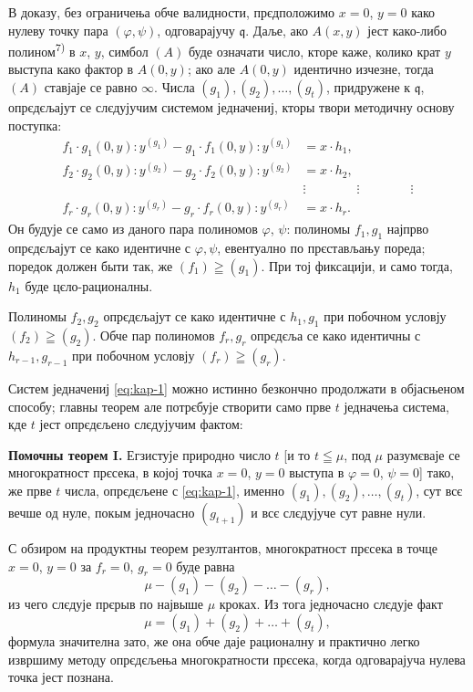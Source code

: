 \documentclass[11pt]{article}
\theoremstyle{plain}
\begin{document}
В доказу, без ограничења обче валидности, прєдположимо $x = 0$,
$y = 0$ како нулеву точку пара $(\varphi, \psi)$, одговарајучу
$\mathfrak{q}$. Даље, ако $A(x,y)$ јест како-либо полином\textsuperscript{7)}
в $x$, $y$, симбол $(A)$ буде означати число, кторе каже, колико
крат $y$ выступа како фактор в $A(0,y)$; ако але $A(0,y)$
идентично изчезне, тогда $(A)$ ставјаје се равно $\infty$. Числа
$(g_{1}), (g_{2}), \ldots, (g_{t})$, придружене к $\mathfrak{q}$,
опрєдєљајут се слєдујучим системом једначениј, кторы твори
методичну основу поступка:
\begin{equation}\label{eq:kap-1}
\begin{aligned}
f_{1}\cdot g_{1}(0,y):y^{(g_{1})} - g_{1}\cdot f_{1}(0,y):y^{(g_{1})} &= x\cdot h_{1},\\
f_{2}\cdot g_{2}(0,y):y^{(g_{2})} - g_{2}\cdot f_{2}(0,y):y^{(g_{2})} &= x\cdot h_{2},\\
&\vdots \qquad\qquad\vdots\qquad\qquad\vdots\\
f_{r}\cdot g_{r}(0,y):y^{(g_{r})} - g_{r}\cdot f_{r}(0,y):y^{(g_{r})} &= x\cdot h_{r}.
\end{aligned}
\end{equation}
Он будује се само из даного пара полиномов $\varphi$, $\psi$:
полиномы $f_{1}, g_{1}$ најпрво опрєдєљајут се како идентичне с
$\varphi, \psi$, евентуално по прєстављању пореда; поредок
должен быти так, же $(f_1)\geqq(g_1)$. При тој фиксацији, и
само тогда, $h_{1}$ буде цєло-рационалны.

Полиномы $f_{2}, g_{2}$ опрєдєљајут се како идентичне с
$h_{1}, g_{1}$ при побочном условју $(f_2)\geqq(g_2)$. Обче пар
полиномов $f_{r}, g_{r}$ опрєдєља се како идентичны с
$h_{r-1}, g_{r-1}$ при побочном условју $(f_r)\geqq(g_r)$.

Систем једначениј \eqref{eq:kap-1} можно истинно безкончно
продолжати в објасњеном способу; главны теорем але потрєбује
створити само прве $t$ једначења система, кде $t$ јест опрєдєљено
слєдујучим фактом:

\smallskip
\textbf{Помочны теорем I.} Егзистује природно число $t$ [и то
$t\leqq\mu$, под $\mu$ разумєваје се многократност прєсека, в којој
точка $x = 0$, $y = 0$ выступа в $\varphi = 0$, $\psi = 0$] тако, же
прве $t$ числа, опрєдєљене с \eqref{eq:kap-1}, именно
$(g_{1}), (g_{2}), \ldots, (g_{t})$, сут всє вечше од нуле, покым
једночасно $(g_{t+1})$ и всє слєдујуче сут равне нули.

С обзиром на продуктны теорем резултантов, многократност
прєсека в точце $x = 0$, $y = 0$ за $f_{r} = 0$, $g_{r} = 0$ буде
равна
\[
\mu-(g_1)-(g_2)-\ldots-(g_r),
\]
из чего слєдује прєрыв по највыше $\mu$ кроках. Из тога једночасно
слєдује факт
\begin{equation}\label{eq:kap-2}
\mu=(g_1)+(g_2)+\ldots+(g_t),
\end{equation}
формула значителна зато, же она обче даје рационалну и практично
легко извршиму методу опрєдєљења многократности прєсека, когда
одговарајуча нулева точка јест познана.
\end{document}
